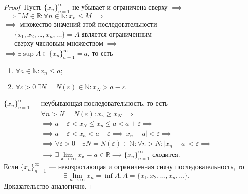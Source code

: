 \documentclass[a4paper,12pt]{article} %
\theoremstyle{remark}
\theoremstyle{definition}
\begin{document}
\begin{proof}
	Пусть $\{x_n\}_{n=1}^{\infty}$ не убывает и ограничена сверху $\implies$ \\
	$\implies \exists M\in \mathbb{R} :\forall n\in \mathbb{N}:x_{n}\le M\implies$ \\
	\indent $\implies$ множество значений этой последовательности \\
	\indent \indent \ \ \ $\{x_1, x_2,\ldots, x_{n}, \ldots\}=A$ является ограниченным \\ 
	\indent \indent \ \ \ сверху числовым множеством $\implies$ \\
	\indent \indent \indent \indent \indent \indent $\implies \exists \sup A\in \{x_n\}_{n=1}^{\infty}=a$, то есть
	\begin{enumerate}
		\item $\forall n\in \mathbb{N}:x_{n}\le a$;
		\item $\forall \varepsilon>0 \ \exists N=N(\varepsilon)\in \mathbb{N}:x_{N}>a-\varepsilon$.
	\end{enumerate}

\begin{center}
\end{center}
$\{x_n\}_{n=1}^{\infty}$ --- неубывающая последовательность, то есть 
\begin{multline}
\forall n>N=N(\varepsilon):x_{n}\ge x_N \implies \\
\implies a-\varepsilon<x_N\le x_{n}\le a<a+\varepsilon\implies \\
\implies a-\varepsilon<x_{n}<a+\varepsilon \implies |x_{n}-a|<\varepsilon \implies \\
\implies \forall \varepsilon>0 \quad \exists N=N(\varepsilon)\in \mathbb{N}:\forall n>N:|x_{n}-a|<\varepsilon \implies \\
\implies \exists \lim_{n \to \infty}x_{n} = a\in \mathbb{R} \implies \{x_n\}_{n=1}^{\infty} \text{ сходится.}
\end{multline}
Если $\{x_n\}_{n=1}^{\infty}$ --- невозрастающая и ограниченная снизу последовательность, то 
\[
\exists \lim_{n \to \infty} x_{n}=\inf A, A = \{x_1, x_2, \ldots, x_{n}, \ldots\} 
.\] 
Доказательство аналогично.
\end{proof}
\end{document}

